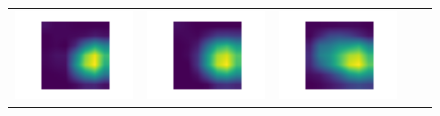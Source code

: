 \begin{figure}[t]
\begin{tabular}{ccccc}
	\includegraphics[trim={28mm 10mm 39mm 10mm},clip,width=\sizeS\linewidth]{fig/7_207/1.png} &
	\includegraphics[trim={28mm 10mm 39mm 10mm},clip,width=\sizeS\linewidth]{fig/7_207/2.png} &
	\includegraphics[trim={28mm 10mm 39mm 10mm},clip,width=\sizeS\linewidth]{fig/7_207/zip_attr.png} \\

\end{tabular}
\end{figure}
